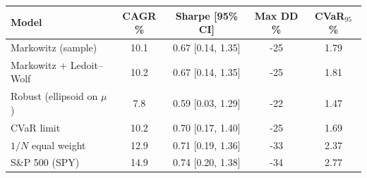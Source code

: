 \begin{tabular}{lcccc}
\toprule
Model & CAGR \% & Sharpe [95\% CI] & Max DD \% & CVaR$_{95}$ \% \\
\midrule
Markowitz (sample) & 10.1 & 0.67 [0.14, 1.35] & -25 & 1.79 \\
Markowitz + Ledoit--Wolf & 10.2 & 0.67 [0.14, 1.35] & -25 & 1.81 \\
Robust (ellipsoid on $\mu$) & 7.8 & 0.59 [0.03, 1.29] & -22 & 1.47 \\
CVaR limit & 10.2 & 0.70 [0.17, 1.40] & -25 & 1.69 \\
$1/N$ equal weight & 12.9 & 0.71 [0.19, 1.36] & -33 & 2.37 \\
S\&P 500 (SPY) & 14.9 & 0.74 [0.20, 1.38] & -34 & 2.77 \\
\bottomrule
\end{tabular}
